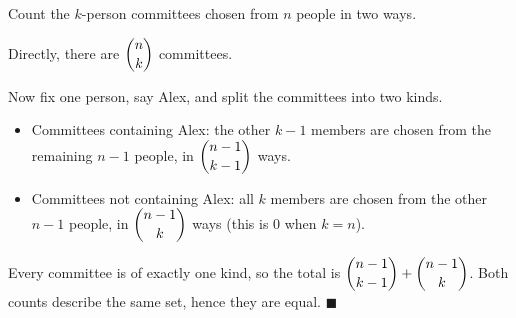 Count the $k$-person committees chosen from $n$ people in two ways.

Directly, there are $\dbinom nk$ committees.

Now fix one person, say Alex, and split the committees into two kinds.
\begin{itemize}
\item Committees containing Alex: the other $k-1$ members are chosen from the remaining $n-1$ people, in $\dbinom{n-1}{k-1}$ ways.
\item Committees not containing Alex: all $k$ members are chosen from the other $n-1$ people, in $\dbinom{n-1}{k}$ ways (this is $0$ when $k=n$).
\end{itemize}
Every committee is of exactly one kind, so the total is $\dbinom{n-1}{k-1}+\dbinom{n-1}{k}$. Both counts describe the same set, hence they are equal. $\blacksquare$
